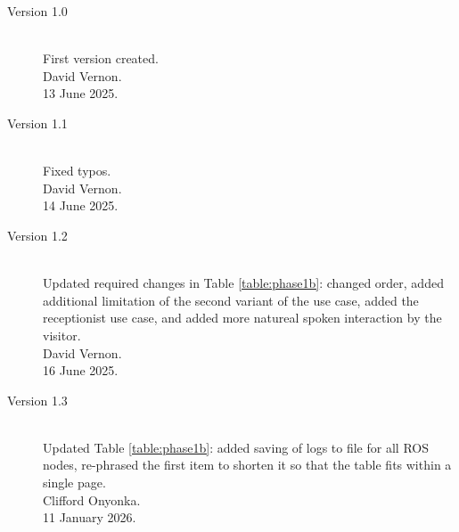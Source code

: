\documentclass{CSSRforAfrica}
\begin{document}
\begin{description}

\item [Version 1.0]~\\
First version created. \\
David Vernon.\\
13 June 2025.   \\               
 
\item [Version 1.1]~\\
Fixed typos. \\
David Vernon.\\
14 June 2025.   \\  

\item [Version 1.2]~\\
Updated required changes in Table \ref{table:phase1b}: changed order, added additional limitation of the second variant of the use case, added the receptionist use case, and added more natureal spoken interaction by the visitor.\\
David Vernon.\\
16 June 2025.   \\

\item [Version 1.3]~\\
Updated Table \ref{table:phase1b}: added saving of logs to file for all ROS nodes, re-phrased the first item to shorten it so that the table fits within a single page.\\
Clifford Onyonka.\\
11 January 2026.   \\


\end{description}
\end{document}
